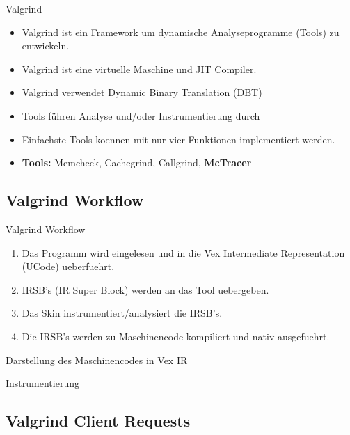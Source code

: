\begin{frame}{Valgrind}
	\begin{itemize}
		\item Valgrind ist ein Framework um dynamische Analyseprogramme (Tools) zu entwickeln.
		\pause \item Valgrind ist eine virtuelle Maschine und JIT Compiler.
		\pause \item Valgrind verwendet Dynamic Binary Translation (DBT) 
		\pause \item Tools führen Analyse und/oder Instrumentierung durch
		\pause \item Einfachste Tools koennen mit nur vier Funktionen implementiert werden.
		\pause \item{\bf Tools:} Memcheck, Cachegrind, Callgrind, {\bf McTracer} 
	\end{itemize}
\end{frame}

\subsection{Valgrind Workflow}

\begin{frame}{Valgrind Workflow}
	\begin{enumerate}
		\item Das Programm wird eingelesen und in die Vex Intermediate Representation (UCode) ueberfuehrt.
		\pause \item IRSB's (IR Super Block) werden an das Tool uebergeben. 
		\pause \item Das Skin instrumentiert/analysiert die IRSB's.
		\pause \item Die IRSB's werden zu Maschinencode kompiliert und nativ ausgefuehrt. 
	\end{enumerate}
\end{frame}

\begin{frame}{Darstellung des Maschinencodes in Vex IR}
	\lstset{frame=single}
	
\end{frame}

\begin{frame}{Instrumentierung}
	\lstset{frame=single}
		
\end{frame}

\subsection{Valgrind Client Requests}


